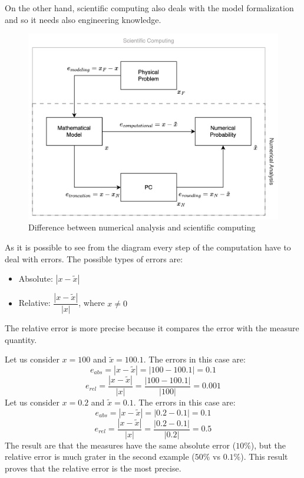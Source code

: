 \documentclass[12pt, a4paper]{report}
\theoremstyle{remark}
\begin{document}
On the other hand, scientific computing also deals with the model formalization and so it needs also engineering knowledge. 
\begin{figure}[H]
    \centering
    \includegraphics[width=0.75\linewidth]{images/difference.png}
    \caption{Difference between numerical analysis and scientific computing}
\end{figure}
As it is possible to see from the diagram every step of the computation have to deal with errors. The possible types of errors are: 
\begin{itemize}
    \item Absolute: $\left\lvert x - \tilde{x} \right\rvert$
    \item Relative: $\dfrac{\left\lvert x - \tilde{x} \right\rvert}{\left\lvert x \right\rvert}$, where $x \neq 0$
\end{itemize}
The relative error is more precise because it compares the error with the measure quantity. 
\begin{example}
    Let us consider $x=100$ and $\tilde{x}=100.1$. The errors in this case are: 
    \[e_{abs}=\left\lvert x - \tilde{x} \right\rvert=\left\lvert 100 - 100.1 \right\rvert=0.1\]
    \[e_{rel}=\dfrac{\left\lvert x - \tilde{x} \right\rvert}{\left\lvert x \right\rvert}=\dfrac{\left\lvert 100 - 100.1 \right\rvert}{\left\lvert 100 \right\rvert}=0.001\]
    Let us consider $x=0.2$ and $\tilde{x}=0.1$. The errors in this case are: 
    \[e_{abs}=\left\lvert x - \tilde{x} \right\rvert=\left\lvert 0.2 - 0.1 \right\rvert=0.1\]
    \[e_{rel}=\dfrac{\left\lvert x - \tilde{x} \right\rvert}{\left\lvert x \right\rvert}=\dfrac{\left\lvert 0.2 - 0.1 \right\rvert}{\left\lvert 0.2 \right\rvert}=0.5\]
    The result are that the measures have the same absolute error ($10\%$), but the relative error is much grater in the second example ($50\%$ vs $0.1\%$).
    This result proves that the relative error is the most precise.
\end{example}
\end{document}
